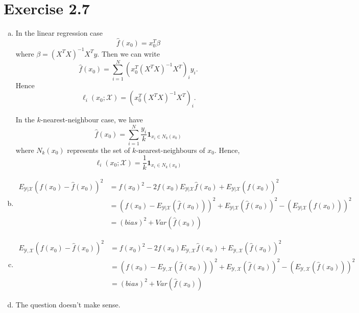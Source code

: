 \documentclass{article}
\begin{document}
\section{Exercise 2.7}
\begin{enumerate}[(a)]
    \item
    In the linear regression case \[
        \hat f(x_0) = x_0^T \beta
    \] where $\beta = (X^T X)^{-1} X^T y$.  Then we can write \[
        \hat f(x_0) = \sum_{i=1}^N \left( x_0^T (X^T X)^{-1} X^T \right)_i y_i.
    \]  Hence \[
        \ell_i(x_0; \mathcal X) = \left( x_0^T (X^T X)^{-1} X^T \right)_i.
    \]

    In the $k$-nearest-neighbour case, we have \[
        \hat f(x_0) = \sum_{i=1}^N \frac{y_i}{k} \mathbf{1}_{x_i \in N_k(x_0)}
    \] where $N_k(x_0)$ represents the set of $k$-nearest-neighbours of $x_0$.
    Hence, \[
        \ell_i(x_0; \mathcal X) = \frac{1}{k} \mathbf{1}_{x_i \in N_k(x_0)}
    \]
    \item
    \begin{align*}
    E_{\mathcal Y | \mathcal X} \left( f(x_0) - \hat f(x_0) \right)^2
    &= f(x_0)^2 - 2 f(x_0)E_{\mathcal Y | \mathcal X}\hat f(x_0) + E_{\mathcal Y | \mathcal X} \left(\hat f(x_0) \right)^2 \\
    &= \left(f(x_0) - E_{\mathcal Y | \mathcal X} \left( \hat f(x_0) \right) \right) ^2 + E_{\mathcal Y | \mathcal X} \left(\hat f(x_0) \right)^2 - \left( E_{\mathcal Y | \mathcal X} \left(\hat f(x_0) \right) \right)^2 \\
    &= (bias)^2 + Var(\hat f(x_0))
    \end{align*}
    \item
    \begin{align*}
    E_{\mathcal Y , \mathcal X} \left( f(x_0) - \hat f(x_0) \right)^2
    &= f(x_0)^2 - 2 f(x_0)E_{\mathcal Y , \mathcal X}\hat f(x_0) + E_{\mathcal Y , \mathcal X} \left(\hat f(x_0) \right)^2 \\
    &= \left(f(x_0) - E_{\mathcal Y , \mathcal X} \left( \hat f(x_0) \right) \right) ^2 + E_{\mathcal Y , \mathcal X} \left(\hat f(x_0) \right)^2 - \left( E_{\mathcal Y , \mathcal X} \left(\hat f(x_0) \right) \right)^2 \\
    &= (bias)^2 + Var(\hat f(x_0))
    \end{align*}
    \item
    The question doesn't make sense.

\end{enumerate}
\end{document}
